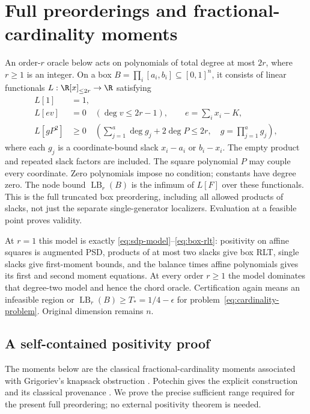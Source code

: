 \section{Full preorderings and fractional-cardinality moments}
\label{sec:cardinality-preordering}
An order-$r$ oracle below acts on polynomials of total degree at most
$2r$, where $r\ge1$ is an integer. On a box
$B=\prod_i[a_i,b_i]\subseteq[0,1]^n$, it consists of linear functionals
$L:\R[x]_{\le2r}\to\R$ satisfying
\begin{align}
 L[1]&=1,\label{eq:preorder-normalization}\\
 L[e v]&=0\quad(\deg v\le2r-1),\qquad
 e=\sum_i x_i-K,\label{eq:preorder-equality}\\
 L[g P^2]&\ge0\quad
 \left(\sum_{j=1}^a\deg g_j+2\deg P\le2r,\quad
 g=\prod_{j=1}^a g_j\right),\label{eq:preorder-positivity}
\end{align}
where each $g_j$ is a coordinate-bound slack $x_i-a_i$ or $b_i-x_i$.
The empty product and repeated slack factors are included. The square
polynomial $P$ may couple every coordinate. Zero polynomials impose no
condition; constants have degree zero. The node bound
$\operatorname{LB}_r(B)$ is the infimum of $L[F]$ over these functionals.
This is the full truncated box preordering, including all allowed products
of slacks, not just the separate single-generator localizers. Evaluation
at a feasible point proves validity.

At $r=1$ this model is exactly
\eqref{eq:sdp-model}--\eqref{eq:box-rlt}: positivity on affine squares
is augmented PSD, products of at most two slacks give box RLT, single
slacks give first-moment bounds, and the balance times affine polynomials
gives its first and second moment equations. At every order $r\ge1$ the
model dominates that degree-two model and hence the chord oracle.
Certification again means an infeasible region or
$\operatorname{LB}_r(B)\ge T_*=1/4-\epsilon$ for
problem~\eqref{eq:cardinality-problem}. Original dimension remains $n$.

\subsection{A self-contained positivity proof}
The moments below are the classical fractional-cardinality moments
associated with Grigoriev's knapsack obstruction
\citep{Grigoriev2001}. Potechin gives the explicit construction and its
classical provenance \citep[Theorem 1, Example 18, Theorem 44]{Potechin2019}.
We prove the precise sufficient range required for the present full
preordering; no external positivity theorem is needed.

